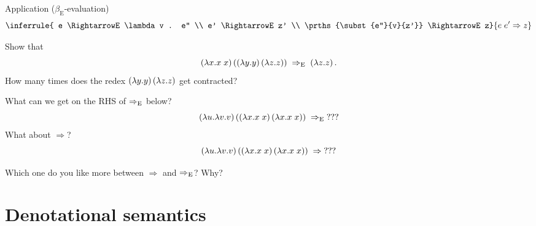 \begin{enumcirc}
	Application ($\beta_\textrm{E}$-evaluation)
	\[
		\inferrule
		{
			e \RightarrowE \lambda v . e'' \\
			e' \RightarrowE z' \\
			\prths{\subst{e''}{v}{z'}} \RightarrowE z}
		{e \; e' \Rightarrow z}
	\]
	\begin{exercisetab}
		\begin{enumalpha}
			\item
			Show that
			\[
				\left( \lambda x. x \; x \right)
				\left( 
					\left( \lambda y. y \right)
					\left( \lambda z. z \right)
				 \right)
				\;\Rightarrow_{\textrm{E}} \;
				\left( \lambda z. z \right).
			\]
			How many times does the redex $\left( \lambda y. y \right) \left( \lambda z. z \right)$ get
			contracted?
			\item
			What can we get on the RHS of $\Rightarrow_{\textrm{E}}$ below?
			\[
				\left( \lambda u. \lambda v. v \right)
				\left( 
					\left( \lambda x. x \; x \right)
					\left( \lambda x. x \; x \right)
				 \right)
				\;\Rightarrow_{\textrm{E}} \;
				???
			\]
			What about $\Rightarrow$?
			\[
				\left( \lambda u. \lambda v. v \right)
				\left( 
					\left( \lambda x. x \; x \right)
					\left( \lambda x. x \; x \right)
				 \right)
				\;\Rightarrow \;
				???
			\]
			\item
			Which one do you like more between $\Rightarrow$ and $\Rightarrow_{\textrm{E}}$?
			Why?
		\end{enumalpha}
	\end{exercisetab}
\end{enumcirc}

\section{Denotational semantics}

